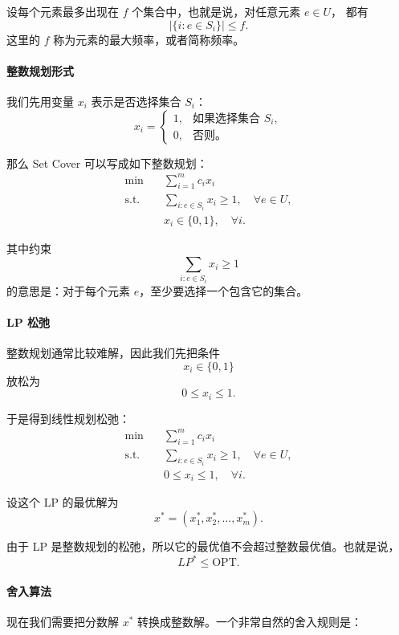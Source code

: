 \documentclass[UTF8,openany,12pt]{ctexbook}
\theoremstyle{remark}
\newcommand{\OPT}{\mathrm{OPT}}
\begin{document}
设每个元素最多出现在 $f$ 个集合中，也就是说，对任意元素 $e \in U$，
都有
\[
|\{i : e \in S_i\}| \le f.
\]
这里的 $f$ 称为元素的最大频率，或者简称频率。

\paragraph{整数规划形式}

我们先用变量 $x_i$ 表示是否选择集合 $S_i$：
\[
x_i =
\begin{cases}
1, & \text{如果选择集合 } S_i,\\
0, & \text{否则。}
\end{cases}
\]

那么 Set Cover 可以写成如下整数规划：
\[
\begin{aligned}
\min \quad & \sum_{i=1}^m c_i x_i \\
\text{s.t.} \quad & \sum_{i: e \in S_i} x_i \ge 1, \quad \forall e \in U, \\
& x_i \in \{0,1\}, \quad \forall i.
\end{aligned}
\]

其中约束
\[
\sum_{i: e \in S_i} x_i \ge 1
\]
的意思是：对于每个元素 $e$，至少要选择一个包含它的集合。

\paragraph{LP 松弛}

整数规划通常比较难解，因此我们先把条件
\[
x_i \in \{0,1\}
\]
放松为
\[
0 \le x_i \le 1.
\]

于是得到线性规划松弛：
\[
\begin{aligned}
\min \quad & \sum_{i=1}^m c_i x_i \\
\text{s.t.} \quad & \sum_{i: e \in S_i} x_i \ge 1, \quad \forall e \in U, \\
& 0 \le x_i \le 1, \quad \forall i.
\end{aligned}
\]

设这个 LP 的最优解为
\[
x^* = (x_1^*,x_2^*,\dots,x_m^*).
\]

由于 LP 是整数规划的松弛，所以它的最优值不会超过整数最优值。也就是说，
\[
LP^* \le \OPT.
\]

\paragraph{舍入算法}

现在我们需要把分数解 $x^*$ 转换成整数解。一个非常自然的舍入规则是：
\end{document}
